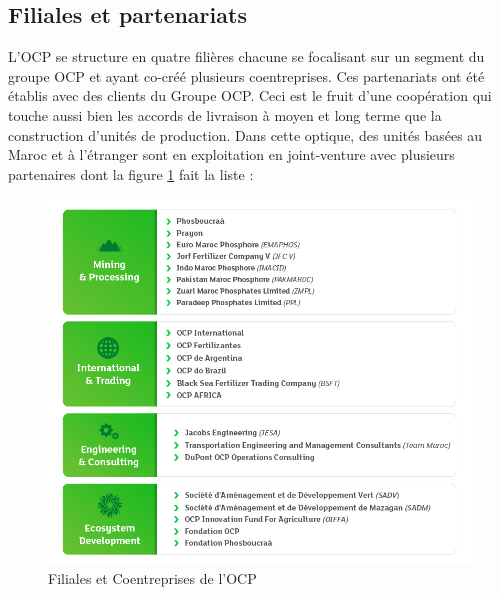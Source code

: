 	\subsection{Filiales et partenariats}
	L'OCP se structure en quatre filières chacune se focalisant sur un segment du groupe OCP et ayant co-créé plusieurs coentreprises. Ces partenariats ont été établis avec des clients du Groupe OCP. Ceci est le fruit d’une coopération qui touche aussi bien les accords de livraison à moyen et long terme que la
	construction d'unités de production. Dans cette optique, des unités basées au Maroc et à
	l'étranger sont en exploitation en joint-venture avec plusieurs partenaires dont la figure \ref{fig:mesh1} fait la liste : 
	\begin{figure}[h]
    		\centering
    		\includegraphics[scale=0.62]{Companies-ocp}
    		\caption{Filiales et Coentreprises de l’OCP\cite{ocp-fil}}
    		\label{fig:mesh1}
	\end{figure}
